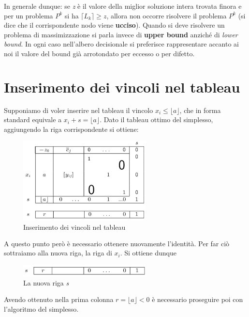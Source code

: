 \documentclass[11pt]{book}
\begin{document}
In generale dunque: se {\em z} \`e il valore della miglior soluzione
intera trovata finora e per un problema $P^k$ si ha $\lceil L_k \rceil
\geq z$, allora non occorre risolvere il problema $P^k$ (si dice che
il corrispondente nodo viene {\bf ucciso}). Quando si deve risolvere
un problema di massimizzazione si parla invece di {\bf upper bound}
anzich\'e di {\em lower bound}. In ogni caso nell'albero decisionale
si preferisce rappresentare accanto ai noi il valore del bound gi\`a
arrotondato per eccesso o per difetto.

\section{Inserimento dei vincoli nel tableau}

Supponiamo di voler inserire nel tableau il vincolo $x_i \leq \lfloor
a \rfloor$, che in forma standard equivale a $x_i + s = \lfloor a
\rfloor$. Dato il tableau ottimo del simplesso, aggiungendo la riga
corrispondente si ottiene:

\begin{figure}[h!]
  \centering
  \includegraphics[width=0.6\textwidth]{images/cap6tab8.png}
  \caption{Inserimento dei vincoli nel tableau}
  \label{cap6tab8}
\end{figure}

A questo punto per\`o \`e necessario ottenere nuovamente
l'identit\`a. Per far ci\`o sottraiamo alla nuova riga, la riga di
$x_i$. Si ottiene dunque

\begin{figure}[h!]
  \centering
  \includegraphics[width=0.6\textwidth]{images/cap6tab9.png}
  \caption{La nuova riga {\em s}}
  \label{cap6tab9}
\end{figure}

Avendo ottenuto nella prima colonna $r = \lfloor a \rfloor < 0$ \`e
necessario proseguire poi con l'algoritmo del simplesso.
\end{document}
